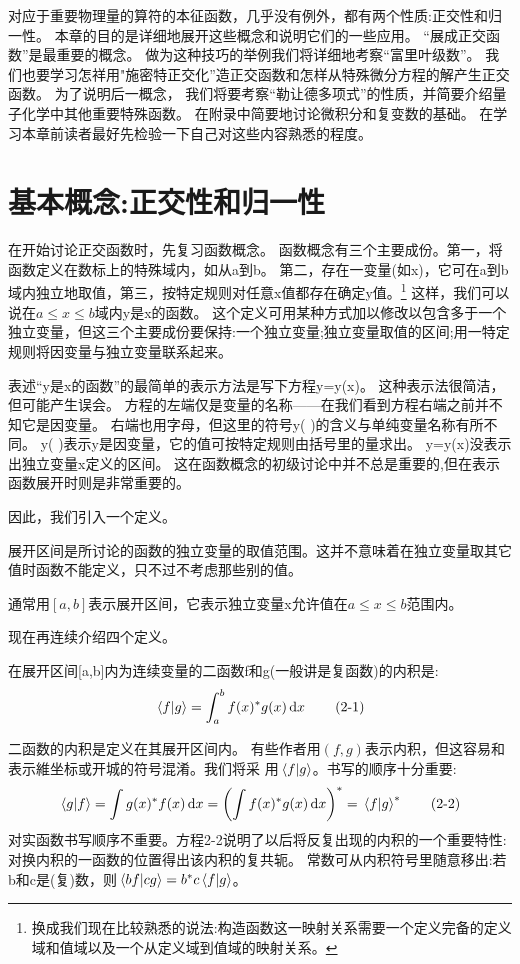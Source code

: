 对应于重要物理量的算符的本征函数，几乎没有例外，都有两个性质:正交性和归一性。
本章的目的是详细地展开这些概念和说明它们的一些应用。 
“展成正交函数”是最重要的概念。
做为这种技巧的举例我们将详细地考察“富里叶级数”。
我们也要学习怎祥用"施密特正交化”造正交函数和怎样从特殊微分方程的解产生正交函数。
为了说明后一概念， 我们将要考察“勒让德多项式”的性质，并简要介绍量子化学中其他重要特殊函数。
在附录中简要地讨论微积分和复变数的基础。
在学习本章前读者最好先检验一下自己对这些内容熟悉的程度。

\section{基本概念:正交性和归一性}
在开始讨论正交函数时，先复习函数概念。
函数概念有三个主要成份。第一，将函数定义在数标上的特殊域内，如从a到b。
第二，存在一变量(如x)，它可在a到b域内独立地取值，第三，按特定规则对任意x值都存在确定y值。\footnote{换成我们现在比较熟悉的说法:构造函数这一映射关系需要一个定义完备的定义域和值域以及一个从定义域到值域的映射关系。}
这样，我们可以说在$a \leq x \leq b$域内y是x的函数。
这个定义可用某种方式加以修改以包含多于一个独立变量，但这三个主要成份要保持:一个独立变量;独立变量取值的区间;用一特定规则将因变量与独立变量联系起来。

表述“y是x的函数”的最简单的表示方法是写下方程y=y(x)。
这种表示法很简洁，但可能产生误会。
方程的左端仅是变量的名称——在我们看到方程右端之前并不知它是因变量。
右端也用字母，但这里的符号y( )的含义与单纯变量名称有所不同。
y( )表示y是因变量，它的值可按特定规则由括号里的量求出。
y=y(x)没表示出独立变量x定义的区间。
这在函数概念的初级讨论中并不总是重要的,但在表示函数展开时则是非常重要的。

因此，我们引入一个定义。
\begin{definition}[展开区间或简称区间]
    展开区间是所讨论的函数的独立变量的取值范围。这并不意味着在独立变量取其它值时函数不能定义，只不过不考虑那些别的值。
\end{definition}
   
通常用$[a,b]$表示展开区间，它表示独立变量x允许值在$a \leq x \leq b$范围内。

现在再连续介绍四个定义。
\begin{definition}[内积]
    在展开区间[a,b]内为连续变量的二函数f和g(一般讲是复函数)的内积是:
    \[\bra*{f}\ket*{g}=\int_a^bf(x)^*g(x)\dd{x} \tag{2-1}\]
\end{definition}

二函数的内积是定义在其展开区间内。
有些作者用$(f,g)$表示内积，但这容易和表示維坐标或开城的符号混淆。我们将采
用$\bra*{f}\ket*{g}$。书写的顺序十分重要: 
\[\bra*{g}\ket*{f}=\int g(x)^*f(x)\dd{x}=\left ( \int f(x)^*g(x)\dd{x} \right )^*=\bra*{f}\ket*{g}^* \tag{2-2}\]
对实函数书写顺序不重要。方程2-2说明了以后将反复出现的内积的一个重要特性:对换内积的一函数的位置得出该内积的复共轭。
常数可从内积符号里随意移出:若b和c是(复)数，则$\bra*{bf}\ket*{cg}=b^*c\bra*{f}\ket*{g}$。

